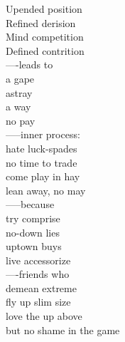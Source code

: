 Upended position\\
Refined derision\\
Mind competition\\
Defined contrition\\
----leads to\\
a gape\\
astray\\
a way\\
no pay\\
-----inner process:\\
hate luck-spades\\
no time to trade\\
come play in hay\\
lean away, no may\\
-----because\\
try comprise\\
no-down lies\\
uptown buys\\
live accessorize\\
----friends who\\
demean extreme\\
fly up slim size\\
love the up above\\
but no shame in the game\\

